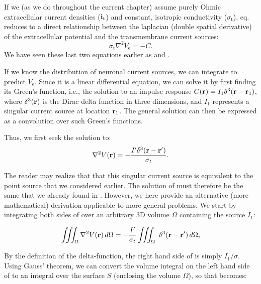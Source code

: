 If we (as we do throughout the current chapter) assume purely Ohmic extracellular current densities (${\bf i}_\mathrm{t}$) 
and constant, isotropic conductivity ($\sigma_\mathrm{t}$), eq.  reduces to a direct relationship 
between the laplacian (double spatial derivative) of the extracellular potential and the transmembrane current sources: 
\begin{equation}
\sigma_\text{t} \nabla^2{V_\mathrm{e}} = -C.
\label{eq:VC:CSD3}
\end{equation}
We have seen these last two equations earlier as  and . 

If we know the distribution of neuronal current sources, 
we can integrate  to predict $V_\mathrm{e}$. 
Since it is a linear differential equation, we can solve it by first finding its Green's function, 
i.e., the solution to an impulse response $C({\bf r}) = I_1 \delta^3({\bf r}-{\bf r}_1)$, 
where $\delta^3({\bf r})$ is the Dirac delta function in three dimensions, 
and $I_1$ represents a singular current source at location ${\bf r}_1$. 
The general solution can then be expressed as a convolution over such Green's functions. 

Thus, we first seek the solution to:
\begin{equation}
\nabla^2 V({\bf r}) = - \frac{I' \delta^3({\bf r-r'})}{\sigma_t}.
\label{eq:VC:CSD5}
\end{equation}

The reader may realize that that this singular current source is equivalent to the point source 
that we considered earlier. The solution of  must therefore be the same 
that we already found in . 
However, we here provide an alternative (more mathematical) derivation applicable
to more general problems. We start by integrating both sides of  
over an arbitrary 3D volume $\Omega$ containing the source $I_1$:

\begin{equation}
\iiint_{\Omega} \nabla^2V({\bf r}) \,d\Omega =  - \frac{I'}{\sigma_t} \iiint_\Omega \ \delta^3({\bf r-r'}) \, d\Omega,
\label{eq:VC:marit}
\end{equation}

By the definition of the delta-function, the right hand side of  is simply $I_1/\sigma$. 
Using Gauss' theorem, we can convert the volume integral on the left hand side of  
to an integral over the surface $S$ (enclosing the volume $\Omega$), 
so that  becomes:

